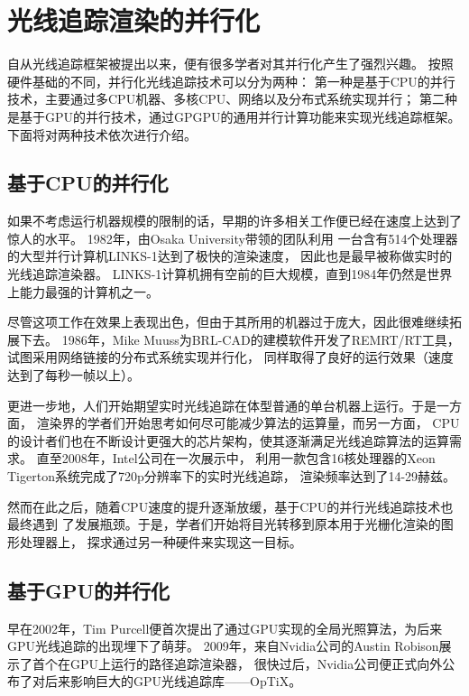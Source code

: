 \section{光线追踪渲染的并行化}

自从光线追踪框架被提出以来，便有很多学者对其并行化产生了强烈兴趣。
按照硬件基础的不同，并行化光线追踪技术可以分为两种：
第一种是基于CPU的并行技术，主要通过多CPU机器、多核CPU、网络以及分布式系统实现并行；
第二种是基于GPU的并行技术，通过GPGPU的通用并行计算功能来实现光线追踪框架。
下面将对两种技术依次进行介绍。

\subsection{基于CPU的并行化}

如果不考虑运行机器规模的限制的话，早期的许多相关工作便已经在速度上达到了惊人的水平。
1982年，由Osaka University带领的团队利用
一台含有514个处理器的大型并行计算机LINKS-1达到了极快的渲染速度\cite{LINKS1}，
因此也是最早被称做实时的光线追踪渲染器。
LINKS-1计算机拥有空前的巨大规模，直到1984年仍然是世界上能力最强的计算机之一。

尽管这项工作在效果上表现出色，但由于其所用的机器过于庞大，因此很难继续拓展下去。
1986年，Mike Muuss为BRL-CAD的建模软件开发了REMRT/RT工具，试图采用网络链接的分布式系统实现并行化，
同样取得了良好的运行效果（速度达到了每秒一帧以上）。

更进一步地，人们开始期望实时光线追踪在体型普通的单台机器上运行。于是一方面，
渲染界的学者们开始思考如何尽可能减少算法的运算量，而另一方面，
CPU的设计者们也在不断设计更强大的芯片架构，使其逐渐满足光线追踪算法的运算需求。
直至2008年，Intel公司在一次展示中，
利用一款包含16核处理器的Xeon Tigerton系统完成了720p分辨率下的实时光线追踪，
渲染频率达到了14-29赫兹\cite{QuakeWars}。

然而在此之后，随着CPU速度的提升逐渐放缓，基于CPU的并行光线追踪技术也最终遇到
了发展瓶颈。于是，学者们开始将目光转移到原本用于光栅化渲染的图形处理器上，
探求通过另一种硬件来实现这一目标。

\subsection{基于GPU的并行化} 

早在2002年，Tim Purcell便首次提出了通过GPU实现的全局光照算法，为后来GPU光线追踪的出现埋下了萌芽。
2009年，来自Nvidia公司的Austin Robison展示了首个在GPU上运行的路径追踪渲染器，
很快过后，Nvidia公司便正式向外公布了对后来影响巨大的GPU光线追踪库——OpTiX\cite{parker2010optix}。

